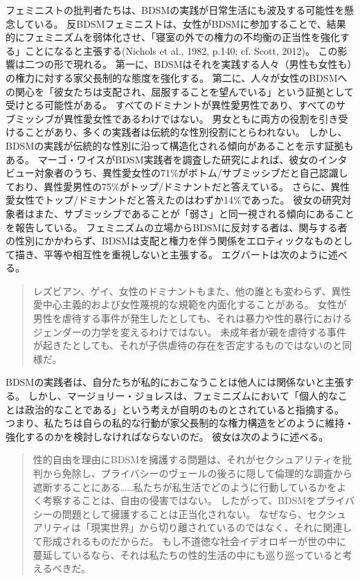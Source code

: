 \documentclass[paper=a4,book,openany]{jlreq}
\newcommand{\ig}[1]{}           %
\begin{document}
フェミニストの批判者たちは、BDSMの実践が日常生活にも波及する可能性を懸念している。
反BDSMフェミニストは、女性がBDSMに参加することで、結果的にフェミニズムを弱体化させ、「寝室の外での権力の不均衡の正当性を強化する」ことになると主張する(Nichols et al., 1982, p.140; cf. Scott, 2012)\nocite{nichols82:_is_sadom_femin}\nocite{scott12:_think_kink}。
この影響は二つの形で現れる。
第一に、BDSMはそれを実践する人々（男性も女性も）の権力に対する家父長制的な態度を強化する。
第二に、人々が女性のBDSMへの関心を「彼女たちは支配され、屈服することを望んでいる」という証拠として受けとる可能性がある。
すべてのドミナントが異性愛男性であり、すべてのサブミッシブが異性愛女性であるわけではない。
男女ともに両方の役割を引き受けることがあり、多くの実践者は伝統的な性別役割にとらわれない。
しかし、BDSMの実践が伝統的な性別に沿って構造化される傾向があることを示す証拠もある。
マーゴ・ワイス\ig{Margo Weiss}がBDSM実践者を調査した研究によれば、彼女のインタビュー対象者のうち、異性愛女性の71\%がボトム/サブミッシブだと自己認識しており、異性愛男性の75\%がトップ/ドミナントだと答えている\citep[p.262 fn.10]{weiss11:_techn_pleas}。
さらに、異性愛女性でトップ/ドミナントだと答えたのはわずか14\%であった。
彼女の研究対象者はまた、サブミッシブであることが「弱さ」と同一視される傾向にあることを報告している\citep[p.176]{weiss11:_techn_pleas}。
フェミニズムの立場からBDSMに反対する者は、関与する者の性別にかかわらず、BDSMは支配と権力を伴う関係をエロティックなものとして描き、平等や相互性を重視しないと主張する。
エグバートは次のように述べる。

\begin{quote}
  レズビアン、ゲイ、女性のドミナントもまた、他の誰とも変わらず、異性愛中心主義的および女性蔑視的な規範を内面化することがある。
女性が男性を虐待する事件が発生したとしても、それは暴力や性的暴行におけるジェンダーの力学を変えるわけではない。
未成年者が親を虐待する事件が起きたとしても、それが子供虐待の存在を否定するものではないのと同様だ。
\citep{egbert15:_bdsm_faq_frequen_asser_quibb}
\end{quote}

BDSMの実践者は、自分たちが私的におこなうことは他人には関係ないと主張する。
しかし、マージョリー・ジョレスは、フェミニズムにおいて「個人的なことは政治的なことである」という考えが自明のものとされていると指摘する。
つまり、私たちは自らの私的な行動が家父長制的な権力構造をどのように維持・強化するのかを検討しなければならないのだ。
彼女は次のように述べる。

\begin{quote}
  性的自由を理由にBDSMを擁護する問題は、それがセクシュアリティを批判から免除し、プライバシーのヴェールの後ろに隠して倫理的な調査から遮断することにある……私たちが私生活でどのように行動しているかをよく考察することは、自由の侵害ではない。
したがって、BDSMをプライバシーの問題として擁護することは正当化されない。
なぜなら、セクシュアリティは「現実世界」から切り離されているのではなく、それに関連して形成されるものだからだ。
もし不道徳な社会イデオロギーが世の中に蔓延しているなら、それは私たちの性的生活の中にも巡り巡っていると考えるべきだ。
\citep[p.268]{jolles15:_pleas_pain_femin_polit_rough_sex}

\end{quote}
\end{document}
